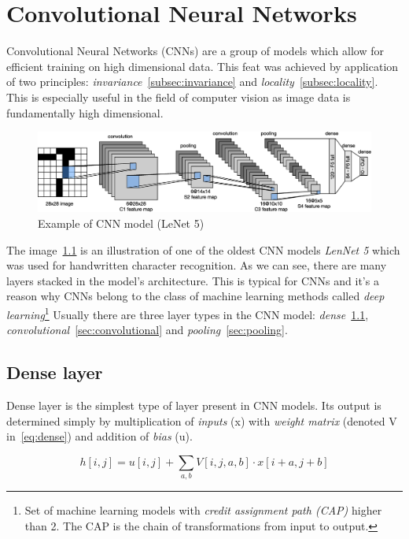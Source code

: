 \chapter{Convolutional Neural Networks}\label{ch:cnn}
Convolutional Neural Networks (CNNs) are a group of models which allow for efficient training on high dimensional data.
This feat was achieved by application of two principles: \textit{invariance}~\ref{subsec:invariance} and
\textit{locality}~\ref{subsec:locality}.
This is especially useful in the field of computer vision as image data is fundamentally high dimensional.

\begin{figure}[H]
    \centering
    \includegraphics[width=\columnwidth]{images/cnn/lenet.eps}
    \caption{Example of CNN model (LeNet 5)~\cite{CNN}}
    \label{fig:cnn}
\end{figure}

The image~\ref{fig:cnn} is an illustration of one of the oldest CNN models \textit{LenNet 5} which was used for
handwritten character recognition.
As we can see, there are many layers stacked in the model's architecture.
This is typical for CNNs and it's a reason why CNNs belong to the class of machine learning methods called
\textit{deep learning}\footnote{Set of machine learning models with
\textit{credit assignment path (CAP)} higher than 2.
The CAP is the chain of transformations from input to output.}
Usually there are three layer types in the CNN model: \textit{dense}~\ref{sec:dense},
\textit{convolutional}~\ref{sec:convolutional} and \textit{pooling}~\ref{sec:pooling}.

\section{Dense layer}\label{sec:dense}
Dense layer is the simplest type of layer present in CNN models.
Its output is determined simply by multiplication of \textit{inputs} (x) with \textit{weight matrix}
(denoted V in~\ref{eq:dense}) and addition of \textit{bias} (u).

\begin{equation}\label{eq:dense}
    h[i, j] = u[i,j] + \sum_{a,b} V[i,j,a,b] \cdot x[i+a,j+b]
\end{equation}

